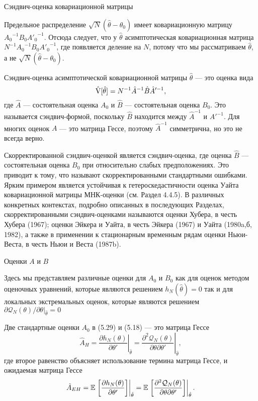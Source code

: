 \begin{center}
Сэндвич-оценка ковариационной матрицы
\end{center}

Предельное распределение $\sqrt{N}(\hat{\theta}-\theta_0)$ имеет ковариационную матрицу ${A_0}^{-1} B_0 {A'_0}^{-1}$. Отсюда следует, что у $\hat{\theta}$ асимптотическая ковариационная матрица $N^{-1}{A_0}^{-1} B_0 {A'_0}^{-1}$, где появляется деление на $N$, потому что мы рассматриваем $\hat{\theta}$, а не $\sqrt{N}(\hat{\theta}-\theta_0)$.

Сэндвич-оценка асимптотической ковариационной матрицы $\hat{\theta}$ --- это оценка вида
\begin{equation}
\hat{\mathrm{V}}[\hat{\theta}]= N^{-1} \hat{A}^{-1} \hat{B} \hat{A}'^{-1},
\end{equation}
где $\hat{A}$ --- состоятельная оценка $A_0$ и $\hat{B}$ --- состоятельная оценка $B_0$. Это называется сэндвич-формой, поскольку $\hat{B}$ находится между $\hat{A}^{-1}$ и $\hat{A}'^{-1}$. Для многих оценок $A$ --- это матрица Гессе, поэтому $\hat{A}^{-1}$ симметрична, но это не всегда верно.

Скорректированной сэндвич-оценкой является сэндвич-оценка, где оценка $\hat{B}$ --- состоятельная оценка $B_0$ при относительно слабых предположениях. Это приводит к тому, что называют скорректированными стандартными ошибками. Ярким примером является устойчивая к гетероскедастичности оценка Уайта ковариационной матрицы МНК-оценки (см. Раздел 4.4.5). В различных конкретных контекстах, подробно описанных в последующих Разделах, скорректированными сэндвич-оценками называются оценки Хубера, в честь Хубера (1967); оценки Эйкера и Уайта, в честь Эйкера (1967) и Уайта (1980a,б, 1982), а также в применении к стационарным временным рядам оценки Ньюи-Веста, в честь Ньюи и Веста (1987b).

\begin{center}
Оценки $A$ и $B$
\end{center}

Здесь мы представляем различные оценки для $A_0$ и $B_0$ как для оценок методом оценочных уравнений, которые являются решением $h_{N}(\hat{\theta})=0$ так и для локальных экстремальных оценок, которые являются решением $\partial \mathcal{Q}_N(\theta) / \partial \theta |_{\hat{\theta}}=0 $

Две стандартные оценки $A_0$ в (5.29) и (5.18) --- это матрица Гессе
\begin{equation}
\hat{A}_H=\left. \frac{\partial h_{N}(\theta)}{\partial \theta'} \right|_{\hat{\theta}}= \left. \frac{\partial^2 \mathcal{Q}_N(\theta)}{\partial \theta \partial \theta'} \right|_{\hat{\theta}},
\end{equation}
где второе равенство объясняет использование термина матрица Гессе, и ожидаемая матрица Гессе
\begin{equation}
\hat{A}_{EH}=\mathbb{E} \left. \left[ \frac{\partial h_{N}(\theta)}{\partial \theta'}\right] \right|_{\hat{\theta}}= \mathbb{E} \left. \left[ \frac{\partial^2 \mathcal{Q}_N(\theta)}{\partial \theta \partial \theta'} \right] \right|_{\hat{\theta}}.
\end{equation}

